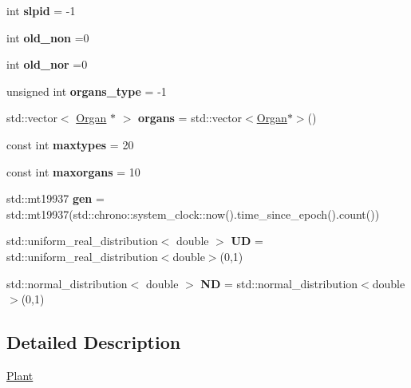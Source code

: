 \begin{DoxyCompactItemize}
int {\bfseries slpid} = -\/1
\item 
\mbox{\label{classCPlantBox_1_1Plant_ab26c30071cc2b277e2f0a86bd11caed2}} 
int {\bfseries old\+\_\+non} =0
\item 
\mbox{\label{classCPlantBox_1_1Plant_a110af538fe663f234428ceaca0861b13}} 
int {\bfseries old\+\_\+nor} =0
\item 
\mbox{\label{classCPlantBox_1_1Plant_a160e35d53d776414357fe0add53415cc}} 
unsigned int {\bfseries organs\+\_\+type} = -\/1
\item 
\mbox{\label{classCPlantBox_1_1Plant_a5661bc7f53a75f5ceb42740cee0b732e}} 
std\+::vector$<$ \hyperlink{classCPlantBox_1_1Organ}{Organ} $\ast$ $>$ {\bfseries organs} = std\+::vector$<$\hyperlink{classCPlantBox_1_1Organ}{Organ}$\ast$$>$()
\item 
\mbox{\label{classCPlantBox_1_1Plant_abc0ed21b284650b6111e6dc004b5822c}} 
const int {\bfseries maxtypes} = 20
\item 
\mbox{\label{classCPlantBox_1_1Plant_a53a6013d1c9fc6dc15b239a9e492bfd3}} 
const int {\bfseries maxorgans} = 10
\item 
\mbox{\label{classCPlantBox_1_1Plant_a250b1204cb32a7825960088a2771a67d}} 
std\+::mt19937 {\bfseries gen} = std\+::mt19937(std\+::chrono\+::system\+\_\+clock\+::now().time\+\_\+since\+\_\+epoch().count())
\item 
\mbox{\label{classCPlantBox_1_1Plant_aa97be5f10a36220561713fc92997a6b1}} 
std\+::uniform\+\_\+real\+\_\+distribution$<$ double $>$ {\bfseries UD} = std\+::uniform\+\_\+real\+\_\+distribution$<$double$>$(0,1)
\item 
\mbox{\label{classCPlantBox_1_1Plant_a98d80e4d528d7e40c24b2676a68adb5c}} 
std\+::normal\+\_\+distribution$<$ double $>$ {\bfseries ND} = std\+::normal\+\_\+distribution$<$double$>$(0,1)
\end{DoxyCompactItemize}


\subsection{Detailed Description}
\hyperlink{classCPlantBox_1_1Plant}{Plant}

